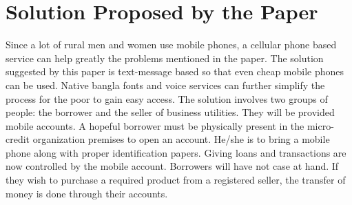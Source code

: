 \documentclass{report}
\begin{document}
\chapter{Solution Proposed by the Paper}
Since a lot of rural men and women use mobile phones,  a cellular phone based service can help greatly the problems mentioned in the paper. The solution suggested by this paper is text-message based so that even cheap mobile phones can be used.  Native bangla fonts and voice services can further simplify the process for the poor to gain easy access.
The solution involves two groups of people: the borrower and the seller of business utilities. They will be provided mobile accounts. A hopeful borrower must be physically present in the micro-credit organization premises to open an account. He/she is to bring a mobile phone along with proper identification papers. Giving loans and transactions are now controlled by the mobile account. Borrowers will have not case at hand. If they wish to purchase a required product from a registered seller, the transfer of money is done through their accounts.
\newpage
\end{document}
